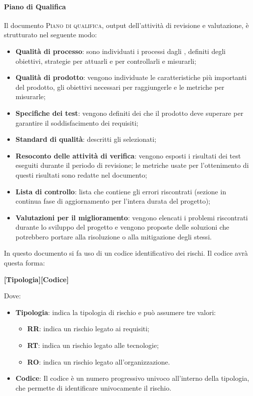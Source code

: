 \paragraph{Piano di Qualifica}
\label{par:revisione_e_valutazione:Piano di Qualifica}
Il documento \textsc{Piano di qualifica}, output dell'attività di revisione e valutazione, è strutturato nel seguente modo:
\begin{itemize}
    \item \textbf{Qualità di processo}: sono individuati i processi dagli , definiti
    degli obiettivi, strategie per attuarli e  per controllarli e misurarli;
    \item \textbf{Qualità di prodotto}: vengono individuate le caratteristiche più importanti del prodotto, gli
    obiettivi necessari per raggiungerle e le metriche per misurarle;
    \item \textbf{Specifiche dei test}: vengono definiti dei  che il prodotto deve superare per
    garantire il soddisfacimento dei requisiti;
    \item \textbf{Standard di qualità}: descritti gli  selezionati;
    \item \textbf{Resoconto delle attività di verifica}: vengono esposti i risultati dei test eseguiti durante il
    periodo di revisione; le metriche usate per l'ottenimento di questi risultati sono redatte nel documento;
    \item \textbf{Lista di controllo}:  lista che contiene gli errori riscontrati (sezione in continua fase di
    aggiornamento per l'intera durata del progetto);
    \item \textbf{Valutazioni per il miglioramento}: vengono elencati i problemi riscontrati durante lo sviluppo del
    progetto e vengono proposte delle soluzioni che potrebbero portare alla risoluzione o alla mitigazione degli stessi.
\end{itemize}

In questo documento si fa uso di un codice identificativo dei rischi. Il codice avrà questa forma:
\begin{center}
	\textbf{[Tipologia][Codice]}
\end{center}
Dove:
\begin{itemize}

	\item \textbf{Tipologia}: indica la tipologia di rischio e può assumere tre valori:
	\begin{itemize}
		\item \textbf{RR}: indica un rischio legato ai requisiti;
		\item \textbf{RT}: indica un rischio legato alle tecnologie;
		\item \textbf{RO}: indica un rischio legato all'organizzazione.
	\end{itemize}
    \item \textbf{Codice}: Il codice è un numero progressivo univoco all'interno della tipologia, che permette di
    identificare univocamente il rischio.
\end{itemize}

